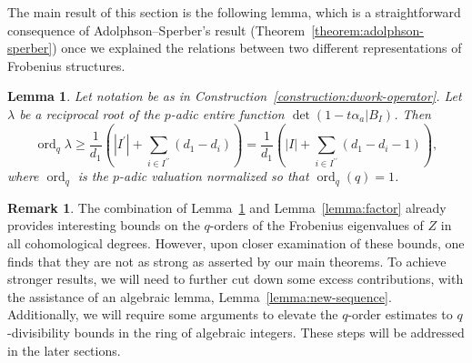 \documentclass{amsart}
\numberwithin{equation}{section}
\theoremstyle{plain}
\newtheorem{lemma}[equation]{Lemma}
\theoremstyle{definition}
\newtheorem{remark}[equation]{Remark}
\begin{document}
The main result of this section is the following lemma, which is a
straightforward consequence of Adolphson--Sperber's result
(Theorem~\ref{theorem:adolphson-sperber}) once we explained the
relations between two different representations of Frobenius
structures.

\begin{lemma}%
\label{lemma:fredholm-determinant-of-alpha-on-bi}
Let notation be as in Construction~\ref{construction:dwork-operator}.
Let \(\lambda\) be a reciprocal root of the \(p\)-adic entire function
\(\det(1-t\alpha_{a}| B_I)\).
Then
\begin{equation*}
\operatorname{ord}_q \lambda \geq \frac{1}{d_1}\left( |I^{\prime}| + \sum_{i\in I^{\prime\prime}} (d_1-d_i)\right)
= \frac{1}{d_1}\left( |I| + \sum_{i\in I^{\prime\prime}} (d_1-d_i-1) \right),
\end{equation*}
where \(\operatorname{ord}_q\) is the \(p\)-adic valuation normalized so that
\(\operatorname{ord}_q(q)=1\).
\end{lemma}


\begin{remark}%
The combination of
Lemma~\ref{lemma:fredholm-determinant-of-alpha-on-bi} and
Lemma~\ref{lemma:factor} already provides interesting bounds on the
\(q\)-orders of the Frobenius eigenvalues of \(Z\) in all
cohomological degrees. However, upon closer examination of these
bounds, one finds that they are not as strong as asserted by our main
theorems.  To achieve stronger results, we will need to further cut
down some excess contributions, with the assistance of an algebraic
lemma, Lemma~\ref{lemma:new-sequence}.  Additionally, we will require
some arguments to elevate the \(q\)-order estimates to
\(q\)-divisibility bounds in the ring of algebraic integers.  These
steps will be addressed in the later sections.
\end{remark}
\end{document}
